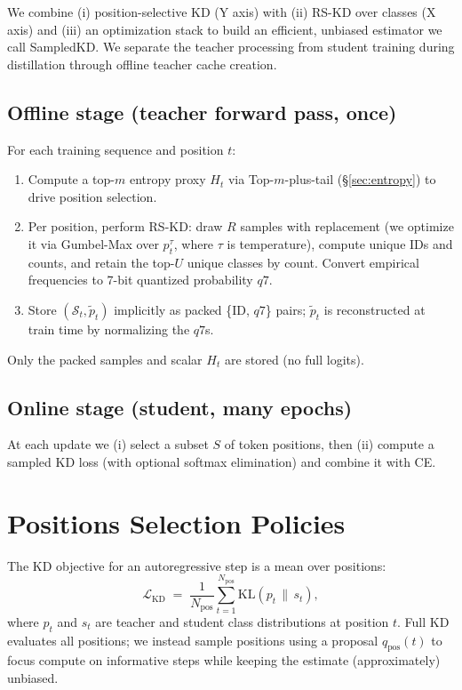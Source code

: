 \documentclass[11pt]{article}
\begin{document}
\FloatBarrier

We combine (i) position-selective KD (Y axis) with (ii) RS-KD over classes (X axis) and (iii) an optimization stack to build an efficient, unbiased estimator we call SampledKD.
We separate the teacher processing from student training during distillation through offline teacher cache creation.

\subsection{Offline stage (teacher forward pass, once)}
For each training sequence and position $t$:
\begin{enumerate}
	\item Compute a top-$m$ entropy proxy $H_t$ via Top-$m$-plus-tail (\S\ref{sec:entropy}) to drive position selection.
	\item Per position, perform RS-KD: draw $R$ samples with replacement (we optimize it via Gumbel-Max over $p_t^\tau$, where $\tau$ is temperature), compute unique IDs and counts, and retain the top-$U$ unique classes by count.
	      Convert empirical frequencies to 7-bit quantized probability $q7$.
	\item Store $(\mathcal{S}_t,\tilde p_t)$ implicitly as packed \{ID, $q7$\} pairs; $\tilde p_t$ is reconstructed at train time by normalizing the $q7$s.
\end{enumerate}
Only the packed samples and scalar $H_t$ are stored (no full logits).

\subsection{Online stage (student, many epochs)}
At each update we (i) select a subset $S$ of token positions, then (ii) compute a sampled KD loss (with optional softmax elimination) and combine it with CE.

\section{Positions Selection Policies}
The KD objective for an autoregressive step is a mean over positions:
\[
	\mathcal{L}_{\text{KD}} \;=\; \frac{1}{N_{\text{pos}}} \sum_{t=1}^{N_{\text{pos}}}
	\mathrm{KL}\!\left(p_t \,\|\, s_t\right),
\]
where $p_t$ and $s_t$ are teacher and student class distributions at position $t$.
Full KD evaluates all positions; we instead sample positions using a proposal
$q_{\text{pos}}(t)$ to focus compute on informative steps while keeping the estimate (approximately) unbiased.
\end{document}
